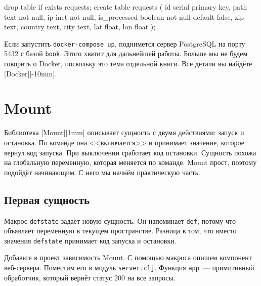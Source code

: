 \else

\begin{english}
  \begin{sql}
drop table if exists requests;
create table requests (
    id            serial primary key,
    path          text not null,
    ip            inet not null,
    is_processed  boolean not null default false,
    zip           text,
    country       text,
    city          text,
    lat           float,
    lon           float
);
  \end{sql}
\end{english}

\fi

Если запустить \verb|docker-compose up|, поднимется сервер Postgre\-SQL на порту
5432 с базой \verb|book|. Этого хватит для дальнейшей работы. Больше мы не
будем говорить о Docker, поскольку это тема отдельной книги. Все детали вы
найдёте [Docker][-10mm].

\section{Mount}


Библиотека [Mount][1mm]
описывает сущность с двумя действиями: запуск и остановка. По команде она
<<включается>> и принимает значение, которое вернул код запуска. При выключении
сработает код остановки. Сущность похожа на глобальную переменную, которая
меняется по команде. Mount прост, поэтому подойдёт начинающим. С него мы начнём
практическую часть.

\subsection{Первая сущность}


Макрос \verb|defstate| задаёт новую сущность. Он напоминает \verb|def|,
потому что объявляет переменную в текущем пространстве. Разница в том, что
вместо значения \verb|defstate| принимает код запуска и остановки.

Добавьте в проект зависимость Mount. С помощью макроса опишем компонент
веб-сервера. Поместим его в модуль \verb|server.clj|. Функция \verb|app|~---
примитивный обработчик, который вернёт статус 200 на все запросы.

\ifnarrow

